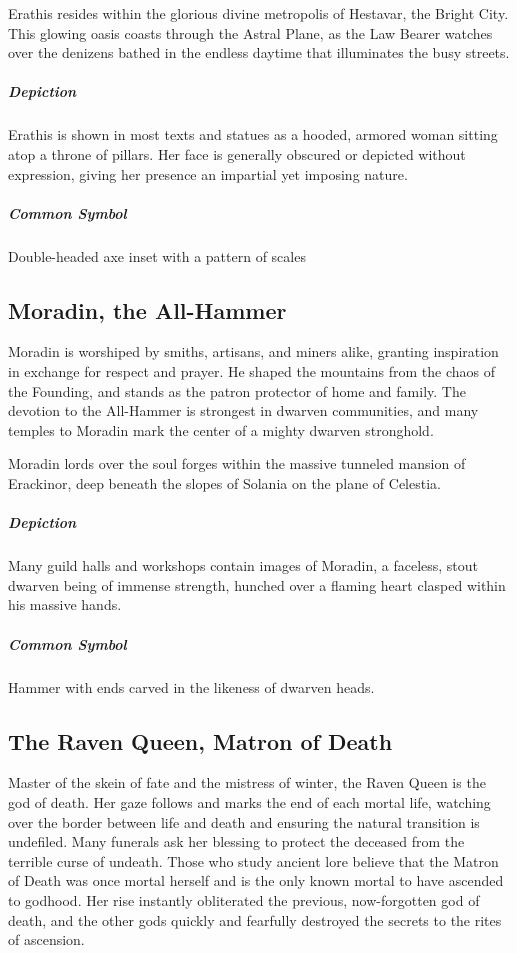 \documentclass[letterpaper,twocolumn,openany,nodeprecatedcode]{dndbook}
\begin{document}
Erathis resides within the glorious divine metropolis of Hestavar, the Bright City.
This glowing oasis coasts through the Astral Plane, as the Law Bearer watches over the
denizens bathed in the endless daytime that illuminates the busy streets.

\subparagraph{Depiction}
Erathis is shown in most texts and statues as a hooded, armored woman sitting atop a
throne of pillars. Her face is generally obscured or depicted without expression,
giving her presence an impartial yet imposing nature.

\subparagraph{Common Symbol}
Double-headed axe inset with a pattern of scales

\subsection{Moradin, the All-Hammer}

Moradin is worshiped by smiths, artisans, and miners alike, granting inspiration in
exchange for respect and prayer. He shaped the mountains from the chaos of the Founding,
and stands as the patron protector of home and family. The devotion to the All-Hammer is
strongest in dwarven communities, and many temples to Moradin mark the center of a mighty
dwarven stronghold.

Moradin lords over the soul forges within the massive tunneled mansion of Erackinor,
deep beneath the slopes of Solania on the plane of Celestia.

\subparagraph{Depiction}
Many guild halls and workshops contain images of Moradin, a faceless, stout dwarven
being of immense strength, hunched over a flaming heart clasped within his massive hands.

\subparagraph{Common Symbol}
Hammer with ends carved in the likeness of dwarven heads.

\subsection{The Raven Queen, Matron of Death}

Master of the skein of fate and the mistress of winter, the Raven Queen is the god of
death. Her gaze follows and marks the end of each mortal life, watching over the border
between life and death and ensuring the natural transition is undefiled. Many funerals
ask her blessing to protect the deceased from the terrible curse of undeath. Those who
study ancient lore believe that the Matron of Death was once mortal herself and is the
only known mortal to have ascended to godhood. Her rise instantly obliterated the previous,
now-forgotten god of death, and the other gods quickly and fearfully destroyed the secrets
to the rites of ascension.
\end{document}
